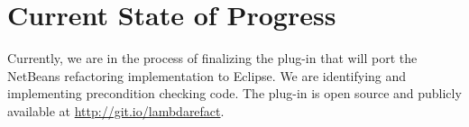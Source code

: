 \section{Current State of Progress}

Currently, we are in the process of finalizing the plug-in that will port the
NetBeans refactoring implementation to Eclipse. We are identifying and
implementing precondition checking code. The plug-in is open source and
publicly available at \url{http://git.io/lambdarefact}.
